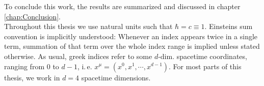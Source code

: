 To conclude this work, the results are summarized and discussed in chapter \ref{chap:Conclusion}. \\
 Throughout this thesis we use natural units such that $\hbar = c  \equiv 1$. Einsteins sum convention is implicitly understood: Whenever an index appears twice in a single term, summation of that term over the whole index range is implied unless stated otherwise. As usual, greek indices refer to some $d$-dim. spacetime coordinates, ranging from $0$ to $d-1$, i.\,e. $x^{\mu} = (x^0, x^1, \cdots, x^{d-1})$. For most parts of this thesis, we work in $d=4$ spacetime dimensions.

